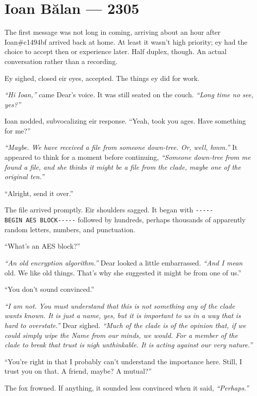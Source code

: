 \hypertarget{ioan-bux103lan-2305}{%
\chapter*{Ioan Bălan — 2305}\label{ioan-bux103lan-2305}}

The first message was not long in coming, arriving about an hour after Ioan\#c1494bf arrived back at home. At least it wasn't high priority; ey had the choice to accept then or experience later. Half duplex, though. An actual conversation rather than a recording.

Ey sighed, closed eir eyes, accepted. The things ey did for work.

\emph{``Hi Ioan,''} came Dear's voice. It was still seated on the couch. \emph{``Long time no see, yes?''}

Ioan nodded, subvocalizing eir response. ``Yeah, took you ages. Have something for me?''

\emph{``Maybe. We have received a file from someone down-tree. Or, well, hmm.''} It appeared to think for a moment before continuing, \emph{``Someone down-tree from me found a file, and she thinks it might be a file from the clade, maybe one of the original ten.''}

``Alright, send it over.''

The file arrived promptly. Eir shoulders sagged. It began with \texttt{-\/-\/-\/-\/-BEGIN\ AES\ BLOCK-\/-\/-\/-\/-} followed by hundreds, perhaps thousands of apparently random letters, numbers, and punctuation.

``What's an AES block?''

\emph{``An old encryption algorithm.''} Dear looked a little embarrassed. \emph{``And I mean} old. {We like old things. That's why she suggested it might be from one of us.''}

``You don't sound convinced.''

\emph{``I am not. You must understand that this is not something any of the clade wants known. It is just a name, yes, but it is important to us in a way that is hard to overstate.''} Dear sighed. \emph{``Much of the clade is of the opinion that, if we could simply wipe the Name from our minds, we would. For a member of the clade to break that trust is nigh unthinkable. It is acting against our very nature.''}

``You're right in that I probably can't understand the importance here. Still, I trust you on that. A friend, maybe? A mutual?''

The fox frowned. If anything, it sounded less convinced when it said, \emph{``Perhaps.''}

